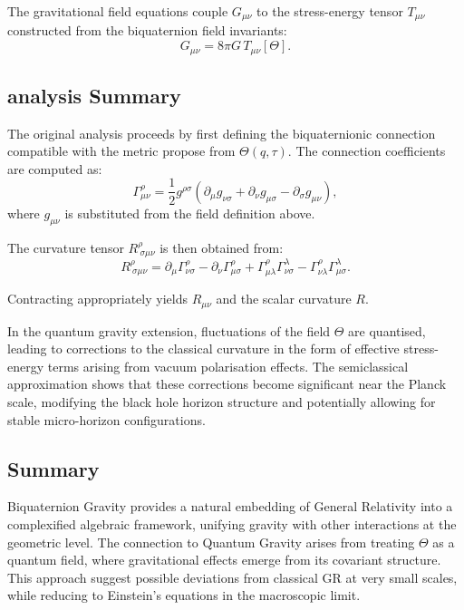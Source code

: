 The gravitational field equations couple $G_{\mu\nu}$ to the stress-energy tensor
$T_{\mu\nu}$ constructed from the biquaternion field invariants:
\begin{equation}
  G_{\mu\nu} = 8\pi G \, T_{\mu\nu}[\Theta] .
\end{equation}

\subsection{analysis Summary}

The original analysis proceeds by first defining the biquaternionic connection
compatible with the metric propose from $\Theta(q,\tau)$. The connection coefficients
are computed as:
\begin{equation}
  \Gamma^\rho_{\mu\nu} =
  \frac{1}{2} g^{\rho\sigma} \left( \partial_\mu g_{\nu\sigma}
  + \partial_\nu g_{\mu\sigma}
  - \partial_\sigma g_{\mu\nu} \right),
\end{equation}
where $g_{\mu\nu}$ is substituted from the field definition above.

The curvature tensor $R^\rho_{\ \sigma\mu\nu}$ is then obtained from:
\begin{equation}
  R^\rho_{\ \sigma\mu\nu} =
  \partial_\mu \Gamma^\rho_{\nu\sigma} -
  \partial_\nu \Gamma^\rho_{\mu\sigma} +
  \Gamma^\rho_{\mu\lambda} \Gamma^\lambda_{\nu\sigma} -
  \Gamma^\rho_{\nu\lambda} \Gamma^\lambda_{\mu\sigma} .
\end{equation}

Contracting appropriately yields $R_{\mu\nu}$ and the scalar curvature $R$.

In the quantum gravity extension, fluctuations of the field $\Theta$ are quantised,
leading to corrections to the classical curvature in the form of effective stress-energy
terms arising from vacuum polarisation effects. The semiclassical approximation shows that
these corrections become significant near the Planck scale, modifying the black hole
horizon structure and potentially allowing for stable micro-horizon configurations.

\subsection{Summary}

Biquaternion Gravity provides a natural embedding of General Relativity into a
complexified algebraic framework, unifying gravity with other interactions at the
geometric level. The connection to Quantum Gravity arises from treating $\Theta$ as a
quantum field, where gravitational effects emerge from its covariant structure. This
approach suggest possible deviations from classical GR at very small scales, while
reducing to Einstein's equations in the macroscopic limit.
